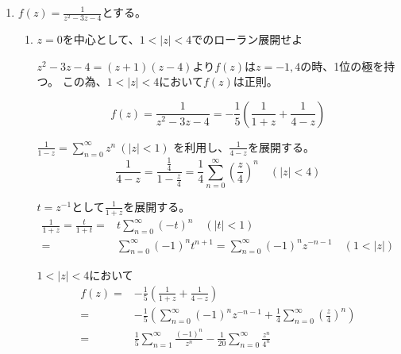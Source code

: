\documentclass[12pt,b5paper]{ltjsarticle}
\begin{document}
\begin{enumerate}
 \item $f(z)=\frac{1}{z^2-3z-4}$とする。
       \begin{enumerate}\renewcommand{\theenumii}{\arabic{enumii}}
        \item $z=0$を中心として、$1<\lvert z \rvert < 4$でのローラン展開せよ

              \dotfill

              $z^2-3z-4=(z+1)(z-4)$より$f(z)$は$z=-1, 4$の時、1位の極を持つ。
              この為、$1<\lvert z \rvert < 4$において$f(z)$は正則。

              \begin{equation}
               f(z)=\frac{1}{z^2-3z-4}
                =-\frac{1}{5}\left(\frac{1}{1+z}+\frac{1}{4-z}\right)
              \end{equation}

              $\frac{1}{1-z}=\sum_{n=0}^{\infty}z^n \ (\lvert z \rvert <1)$
              を利用し、$\frac{1}{4-z}$を展開する。
              \begin{equation}
               \frac{1}{4-z} = \frac{\frac{1}{4}}{1-\frac{z}{4}}
               = \frac{1}{4}\sum_{n=0}^{\infty}\left(\frac{z}{4}\right)^n
               \quad (\lvert z \rvert < 4)
              \end{equation}

              $t=z^{-1}$として$\frac{1}{1+z}$を展開する。
              \begin{align}
               \frac{1}{1+z} = \frac{t}{1+t}
                 =& t \sum_{n=0}^{\infty}(-t)^n \quad (\vert t \rvert<1)\\
               =& \sum_{n=0}^{\infty} (-1)^n t^{n+1}
                 = \sum_{n=0}^{\infty} (-1)^n z^{-n-1} \quad (1 < \lvert z\lvert)
              \end{align}

              $1<\lvert z \rvert < 4$において
              \begin{align}
               f(z) =& -\frac{1}{5}\left(\frac{1}{1+z}+\frac{1}{4-z}\right)\\
               =& -\frac{1}{5}\left(
               \sum_{n=0}^{\infty} (-1)^n z^{-n-1}
                 + \frac{1}{4}\sum_{n=0}^{\infty}\left(\frac{z}{4}\right)^n
               \right)\\
               =& \frac{1}{5}\sum_{n=1}^{\infty} \frac{(-1)^n}{z^{n}}
                - \frac{1}{20}\sum_{n=0}^{\infty} \frac{z^n}{4^n}
              \end{align}




\end{enumerate}
\end{enumerate}
\end{document}
